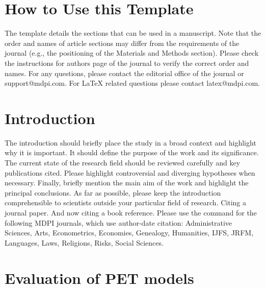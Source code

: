 \documentclass[hydrology,article,submit,moreauthors,pdftex]{Definitions/mdpi}
\begin{document}

\setcounter{section}{-1} %
\section{How to Use this Template}
The template details the sections that can be used in a manuscript. Note that the order and names of article sections may differ from the requirements of the journal (e.g., the positioning of the Materials and Methods section). Please check the instructions for authors page of the journal to verify the correct order and names. For any questions, please contact the editorial office of the journal or support@mdpi.com. For LaTeX related questions please contact latex@mdpi.com.

\section{Introduction}
The introduction should briefly place the study in a broad context and highlight why it is important. It should define the purpose of the work and its significance. The current state of the research field should be reviewed carefully and key publications cited. Please highlight controversial and diverging hypotheses when necessary. Finally, briefly mention the main aim of the work and highlight the principal conclusions. As far as possible, please keep the introduction comprehensible to scientists outside your particular field of research. Citing a journal paper. And now citing a book reference. Please use the command  for the following MDPI journals, which use author-date citation: Administrative Sciences, Arts, Econometrics, Economies, Genealogy, Humanities, IJFS, JRFM, Languages, Laws, Religions, Risks, Social Sciences.

\section{Evaluation of PET models}
\end{document}
